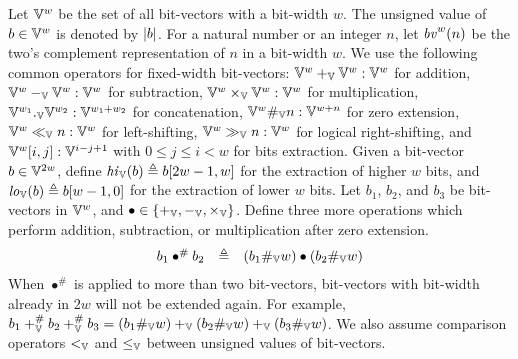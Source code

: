 Let $\mathbb{V}^w$ be the set of all bit-vectors with a bit-width $w$.
The unsigned value of $b \in \mathbb{V}^w$ is denoted by $|b|$.
For a natural number or an integer $n$, let $\mathit{bv}^w(n)$ be the two's complement representation of $n$ in a bit-width $w$.
We use the following common operators for fixed-width bit-vectors: $\mathbb{V}^w +_{\mathbb{V}} \mathbb{V}^w : \mathbb{V}^w$ for addition, $\mathbb{V}^w -_{\mathbb{V}} \mathbb{V}^w : \mathbb{V}^w$ for subtraction, $\mathbb{V}^w \times_{\mathbb{V}} \mathbb{V}^w : \mathbb{V}^w$ for multiplication, $\mathbb{V}^{w_1} ._{\mathbb{V}} \mathbb{V}^{w_2} : \mathbb{V}^{w_1 + w_2}$ for concatenation, $\mathbb{V}^w \#_{\mathbb{V}} n : \mathbb{V}^{w+n}$ for zero extension, $\mathbb{V}^w \ll_{\mathbb{V}} n : \mathbb{V}^w$ for left-shifting, $\mathbb{V}^w \gg_{\mathbb{V}} n : \mathbb{V}^w$ for logical right-shifting, and $\mathbb{V}^w[i,j] : \mathbb{V}^{i - j + 1}$ with $0 \leq j \leq i < w$ for bits extraction.
Given a bit-vector $b \in \mathbb{V}^{2w}$, define $\mathit{hi}_{\mathbb{V}}(b) \triangleq b[2w - 1, w]$ for the extraction of higher $w$ bits, and $\mathit{lo}_{\mathbb{V}}(b) \triangleq b[w - 1, 0]$ for the extraction of lower $w$ bits.
Let $b_1$, $b_2$, and $b_3$ be bit-vectors in $\mathbb{V}^{w}$, and $\bullet \in \{+_{\mathbb{V}}, -_{\mathbb{V}}, \times_{\mathbb{V}}\}$.
Define three more operations which perform addition, subtraction, or multiplication after zero extension.
\[
\begin{array}{rcl}
b_1 \bullet^{\#} b_2 & \triangleq & (b_1 \#_{\mathbb{V}} w) \bullet (b_2 \#_{\mathbb{V}} w) \\
\end{array}
\]
When $\bullet^{\#}$ is applied to more than two bit-vectors, bit-vectors with bit-width already in $2w$ will not be extended again.
For example, $b_1 +_{\mathbb{V}}^{\#} b_2 +_{\mathbb{V}}^{\#} b_3 = (b_1 \#_{\mathbb{V}} w) +_{\mathbb{V}} (b_2 \#_{\mathbb{V}} w) +_{\mathbb{V}} (b_3 \#_{\mathbb{V}} w)$.
We also assume comparison operators $<_{\mathbb{V}}$ and $\leq_{\mathbb{V}}$ between unsigned values of bit-vectors.


